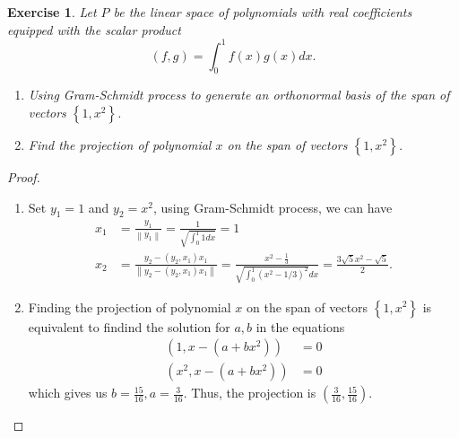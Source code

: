 \documentclass[11pt]{book}
\newtheorem{exercise}{Exercise}[section]
\theoremstyle{definition}
\numberwithin{equation}{chapter}
\begin{document}
\begin{exercise}
Let $P$ be the linear space of polynomials with real coefficients
equipped with the scalar product%
$$
\left(  f,g\right)  =\int_{0}^{1}f\left(  x\right)  g\left(  x\right)  dx.
$$
\begin{enumerate}[label=(\alph*)]
    \item Using Gram-Schmidt process to generate an orthonormal basis of the span of vectors $\left\{  1,x^{2}\right\}$.
    \item Find the projection of polynomial $x$ on the span of vectors $\left\{  1,x^{2}\right\}$.
\end{enumerate}
\end{exercise}
\begin{proof}
~\begin{enumerate}[label=(\alph*)]
    \item Set $y_1 = 1$ and $y_2 = x^2$, using Gram-Schmidt process, we can have 
    \begin{align*}
        x_1 & = \frac{y_1}{\left \|y_1\right \|} = \frac{1}{\sqrt{\int^1_0 1dx}} = 1 \\
        x_2 & = \frac{y_2-(y_2,x_1)x_1}{\left \|y_2-(y_2,x_1)x_1\right \|} = \frac{x^2 - \frac{1}{3}}{\sqrt{\int^1_0 (x^2 - 1/3)^2}dx} = \frac{3\sqrt{5}x^2 - \sqrt{5}}{2}.
    \end{align*}
    \item Finding the projection of polynomial $x$ on the span of vectors $\left\{  1,x^{2}\right\}$ is equivalent to findind the solution for $a,b$ in the equations
    \begin{align*}
        (1,x-(a+bx^2)) & = 0 \\
        (x^2,x-(a+bx^2)) & = 0 
    \end{align*}
    which gives us $b = \frac{15}{16}, a = \frac{3}{16}$. Thus, the projection is $\left(\frac{3}{16},\frac{15}{16}\right)$.
\end{enumerate}
\end{proof}

\medskip
\end{document}

